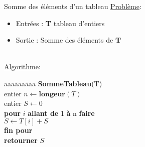 \begin{frame}{Somme des éléments d'un tableau}
  \underline{Problème}:
  \begin{itemize}
  \item Entrées : \textbf{T} tableau d'entiers
  \item Sortie : Somme des éléments de $\mathbf{T}$
  \end{itemize}
~\\
  \underline{Algorithme}:
  \begin{tabbing}
    aaa\=aaa\=aaa\kill
    \textbf{SommeTableau}(T) \\
    \> entier $n \leftarrow \mathbf{longeur}(T)$ \\
    \> entier $S \leftarrow 0$ \\
    \> \textbf{pour} $i$ \textbf{allant de} 1 \textbf{à} n \textbf{faire} \\
    \> \> $S \leftarrow T[i] + S$ \\
    \> \textbf{fin pour} \\
    \> \textbf{retourner} $S$
  \end{tabbing}  
\end{frame}

